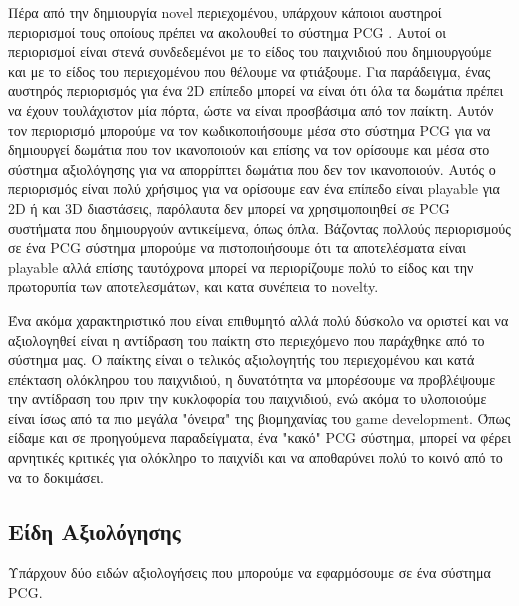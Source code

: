 Πέρα από την δημιουργία novel περιεχομένου, υπάρχουν κάποιοι αυστηροί περιορισμοί τους οποίους πρέπει να ακολουθεί το σύστημα PCG . Αυτοί οι περιορισμοί είναι στενά συνδεδεμένοι με το είδος του παιχνιδιού που δημιουργούμε και με το είδος του περιεχομένου που θέλουμε να φτιάξουμε. Για παράδειγμα, ένας αυστηρός περιορισμός για ένα 2D επίπεδο μπορεί να είναι ότι όλα τα δωμάτια πρέπει να έχουν τουλάχιστον μία πόρτα, ώστε να είναι προσβάσιμα από τον παίκτη. Αυτόν τον περιορισμό μπορούμε να τον κωδικοποιήσουμε μέσα στο σύστημα PCG για να δημιουργεί δωμάτια που τον ικανοποιούν και επίσης να τον ορίσουμε και μέσα στο σύστημα αξιολόγησης για να απορρίπτει δωμάτια που δεν τον ικανοποιούν. Αυτός ο περιορισμός είναι πολύ χρήσιμος για να ορίσουμε εαν ένα επίπεδο είναι playable για 2D ή και 3D διαστάσεις, παρόλαυτα δεν μπορεί να χρησιμοποιηθεί σε PCG συστήματα που δημιουργούν αντικείμενα, όπως όπλα. Βάζοντας πολλούς περιορισμούς σε ένα PCG σύστημα μπορούμε να πιστοποιήσουμε ότι τα αποτελέσματα είναι playable αλλά επίσης ταυτόχρονα μπορεί να περιορίζουμε πολύ το είδος και την πρωτορυπία των αποτελεσμάτων, και κατα συνέπεια το novelty.
\par
Ένα ακόμα χαρακτηριστικό που είναι επιθυμητό αλλά πολύ δύσκολο να οριστεί και να αξιολογηθεί είναι η αντίδραση του παίκτη στο περιεχόμενο που παράχθηκε από το σύστημα μας. Ο παίκτης είναι ο τελικός αξιολογητής του περιεχομένου και κατά επέκταση ολόκληρου του παιχνιδιού, η δυνατότητα να μπορέσουμε να προβλέψουμε την αντίδραση του πριν την κυκλοφορία του παιχνιδιού, ενώ ακόμα το υλοποιούμε είναι ίσως από τα πιο μεγάλα "όνειρα" της βιομηχανίας του game development. Όπως είδαμε και σε προηγούμενα παραδείγματα, ένα "κακό" PCG σύστημα, μπορεί να φέρει αρνητικές κριτικές για ολόκληρο το παιχνίδι και να αποθαρύνει πολύ το κοινό από το να το δοκιμάσει. 


\subsection{Είδη Αξιολόγησης}
Υπάρχουν δύο ειδών αξιολογήσεις που μπορούμε να εφαρμόσουμε σε ένα σύστημα PCG. 

